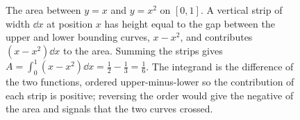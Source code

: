 \begin{figure}[htbp]
\centering
{}
\caption[Area between two curves]{The area between $y = x$ and $y =
x^{2}$ on $[0, 1]$. A vertical strip of width $\dd x$ at position $x$
has height equal to the gap between the upper and lower bounding
curves, $x - x^{2}$, and contributes $(x - x^{2})\dd x$ to the area.
Summing the strips gives $A = \int_{0}^{1}(x - x^{2})\dd x = \tfrac{1}{2}
- \tfrac{1}{3} = \tfrac{1}{6}$. The integrand is the difference of the
two functions, ordered upper-minus-lower so the contribution of each
strip is positive; reversing the order would give the negative of the
area and signals that the two curves crossed.}
\label{fig:vol02:ch06:area-between}
\end{figure}
